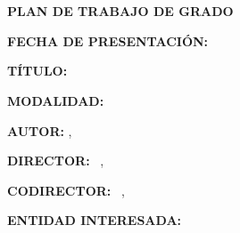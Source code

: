 
\renewcommand{\contentsname}{\hfill\bfseries\normalsize \MakeUppercase{Tabla de Contenido}\hfill}
\renewcommand{\cftaftertoctitle}{\hfill}

\begin{titlepage}
        
    \begin{center}

        \textbf{\MakeUppercase{\Uni}} \\
        \textbf{\MakeUppercase{\Fac}} \\
        \textbf{\MakeUppercase{\Esc}}
        
        \skipline
        
        \textbf{PLAN DE TRABAJO DE GRADO}
        
        \skipline
        \skipline
        
    \end{center}
    
    
    \textbf{FECHA DE PRESENTACIÓN: } \CiudadFecha

    \textbf{TÍTULO: } \Tit
    
    \textbf{MODALIDAD: } \Mod

    \textbf{AUTOR: } \Nam, \Cod

    \textbf{DIRECTOR: } \TDir\ \Dir, \EDir
    
    \textbf{CODIRECTOR: } \TCDir\ \CDir, \ECDir

    \textbf{ENTIDAD INTERESADA: } \EntI 
    
\end{titlepage}

\tableofcontents

\pagebreak
\begin{center}
    \MakeUppercase{\textbf{ \Tit}}
\end{center}